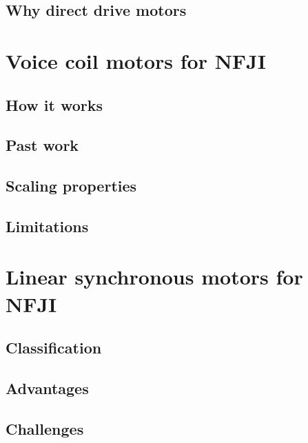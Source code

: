     \subsection{Why direct drive motors}            \label{Chapter:background/needle-free jet injection/why direct drive}


\section{Voice coil motors for NFJI}                \label{Chapter:background/voice coil motors for NFJI}
    \subsection{How it works}                       \label{Chapter:background/voice coil motors for NFJI/how it works}
    \subsection{Past work}                          \label{Chapter:background/voice coil motors for NFJI/past work}
    \subsection{Scaling properties}                 \label{Chapter:background/voice coil motors for NFJI/scaling properties}
    \subsection{Limitations}                        \label{Chapter:background/voice coil motors for NFJI/Limitations}


\section{Linear synchronous motors for NFJI}        \label{Chapter:background/linear synchronous motors for NFJI}
    \subsection{Classification}                     \label{Chapter:background/linear synchronous motors for NFJI/classification}
    \subsection{Advantages}                         \label{Chapter:background/linear synchronous motors for NFJI/advantages}
    \subsection{Challenges}                         \label{Chapter:background/linear synchronous motors for NFJI/challenges}


